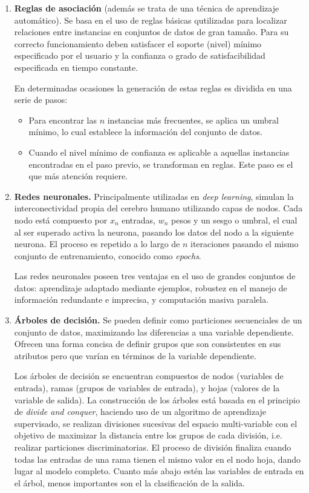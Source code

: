 \begin{enumerate}
	\item \textbf{Reglas de asociación} (además se trata de una técnica de aprendizaje automático). Se basa en el uso de reglas básicas qutilizadas para localizar relaciones entre instancias en conjuntos de datos de gran tamaño. Para su correcto funcionamiento deben satisfacer el soporte (nivel) mínimo especificado por el usuario y la confianza o grado de satisfacibilidad especificada en tiempo constante.
	
	En determinadas ocasiones la generación de estas reglas es dividida en una serie de pasos:
	\begin{itemize}
	\item Para encontrar las $n$ instancias más frecuentes, se aplica un umbral mínimo, lo cual establece la información del conjunto de datos.
	\item Cuando el nivel mínimo de confianza es aplicable a aquellas instancias encontradas en el paso previo, se transforman en reglas. Este paso es el que más atención requiere.
	\end{itemize}
	\item \textbf{Redes neuronales.} Principalmente utilizadas en \textit{deep learning}, simulan la interconectividad propia del cerebro humano utilizando capas de nodos. Cada nodo está compuesto por \(x_n\) entradas, \(w_n\) pesos y un sesgo o umbral, el cual al ser superado activa la neurona, pasando los datos del nodo a la siguiente neurona. El proceso es repetido a lo largo de $n$ iteraciones pasando el mismo conjunto de entrenamiento, conocido como \textit{epochs}.
	
	Las redes neuronales poseen tres ventajas en el uso de grandes conjuntos de datos: aprendizaje adaptado mediante ejemplos, robustez en el manejo de información redundante e imprecisa, y computación masiva paralela.
	\item \textbf{Árboles de decisión.} Se pueden definir como particiones secuenciales de un conjunto de datos, maximizando las diferencias a una variable dependiente. Ofrecen una forma concisa de definir grupos que son consistentes en sus atributos pero que varían en términos de la variable dependiente.
	
	Los árboles de decisión se encuentran compuestos de nodos (variables de entrada), ramas (grupos de variables de entrada), y hojas (valores de la variable de salida). La construcción de los árboles está basada en el principio de \textit{divide and conquer}, haciendo uso de un algoritmo de aprendizaje supervisado, se realizan divisiones sucesivas del espacio multi-variable con el objetivo de maximizar la distancia entre los grupos de cada división, i.e. realizar particiones discriminatorias. El proceso de división finaliza cuando todas las entradas de una rama tienen el mismo valor en el nodo hoja, dando lugar al modelo completo. Cuanto más abajo estén las variables de entrada en el árbol, menos importantes son el la clasificación  de la salida.
	

\end{enumerate}
